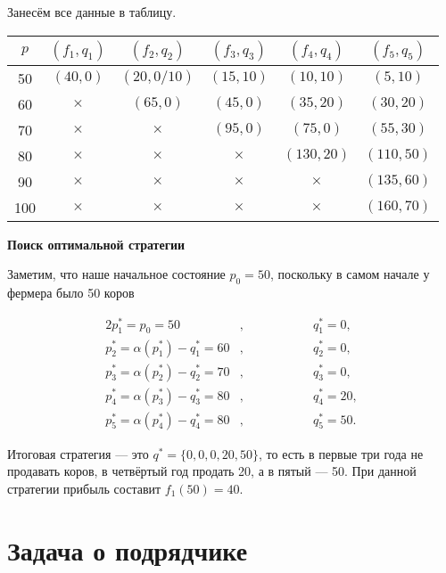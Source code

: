 \begin{enumerate}[nosep]
	Занесём все данные в таблицу.
	
	\begin{table}[H]
		\centering
		\begin{tabular}{ | c | c | c | c | c | c | } 
			\hline
			$p$ & $(f_1, q_1)$ & $(f_2, q_2)$ & $(f_3, q_3)$ & $(f_4, q_4)$ & $(f_5, q_5)$ \\ 
			\hline
			50 & $(40, 0)$ & $(20, 0/10)$ & $(15, 10)$ & $(10, 10)$ & $(5, 10)$ \\\hline
			60 & $\times$ & $(65, 0)$ & $(45, 0)$ & $(35, 20)$ & $(30, 20)$ \\\hline
			70 & $\times$ & $\times$ & $(95, 0)$ & $(75, 0)$ & $(55, 30)$ \\\hline
			80 & $\times$ & $\times$ & $\times$ & $(130, 20)$ & $(110, 50)$ \\\hline
			90 & $\times$ & $\times$ & $\times$ & $\times$ & $(135, 60)$ \\\hline
			100 & $\times$ & $\times$ & $\times$ & $\times$ & $(160, 70)$ \\\hline
		\end{tabular}
	\end{table}
	
	\bigskip
	
	\textbf{Поиск оптимальной стратегии}
	
	Заметим, что наше начальное состояние $p_0 = 50$, поскольку в самом начале у фермера было 50 коров
	
	\begin{alignat*}{2}
		p_1^* = p_0 = 50&, \qquad\qquad &&q_1^* = 0, \\
		p_2^* = \alpha(p_1^*) - q^*_1 = 60 &, &&q_2^* = 0, \\
		p_3^* = \alpha(p_2^*) - q^*_2 = 70 &, &&q_3^* = 0, \\
		p_4^* = \alpha(p_3^*) - q^*_3 = 80 &, &&q_4^* = 20, \\
		p_5^* = \alpha(p_4^*) - q^*_4 = 80 &, &&q_5^* = 50.
	\end{alignat*}
	
	Итоговая стратегия --- это $q^* = \{0, 0, 0, 20, 50\}$, то есть в первые три года не продавать коров, в четвёртый год продать 20, а в пятый --- 50. При данной стратегии прибыль составит $f_1(50) = 40$.
\end{enumerate}

\section{Задача о подрядчике}

